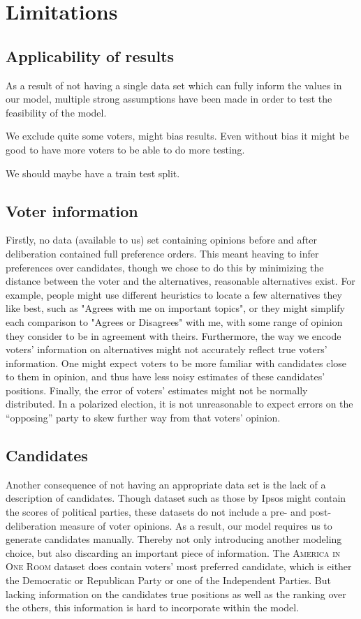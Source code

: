 \section{Limitations}

\subsection{Applicability of results}

As a result of not having a single data set which can fully inform the values
in our model, multiple strong assumptions have been made in order to test the
feasibility of the model.


We exclude quite some voters, might bias results. Even without bias it might be good to have more voters to be able to do more testing.

We should maybe have a train test split.

\subsection{Voter information}

Firstly, no data (available to us) set containing opinions before and after
deliberation contained full preference orders. This meant heaving to infer
preferences over candidates, though we chose to do this by minimizing the
distance between the voter and the alternatives, reasonable alternatives exist.
For example, people might use different heuristics to locate a few alternatives
they like best, such as "Agrees with me on important topics", or they might
simplify each comparison to "Agrees or Disagrees" with me, with some range of
opinion they consider to be in agreement with theirs. Furthermore, the way we
encode voters' information on alternatives might not accurately reflect true
voters' information. One might expect voters to be more familiar with
candidates close to them in opinion, and thus have less noisy estimates of
these candidates' positions. Finally,  the error of voters' estimates might not
be normally distributed. In a polarized election, it is not unreasonable to
expect errors on the ``opposing'' party to skew further way from that voters'
opinion.


\subsection{Candidates}

Another consequence of not having an appropriate data
set is the lack of a description of candidates. Though dataset such as those by
Ipsos might contain the scores of political parties, these datasets do not
include a pre- and post-deliberation measure of voter opinions. As a result,
our model requires us to generate candidates manually. Thereby not only
introducing another modeling choice, but also discarding an important piece of
information. The \textsc{America in One Room} dataset does contain voters' most
preferred candidate, which is either the Democratic or Republican Party or one
of the Independent Parties. But lacking information on the candidates true
positions as well as the ranking over the others, this information is hard to
incorporate within the model.

